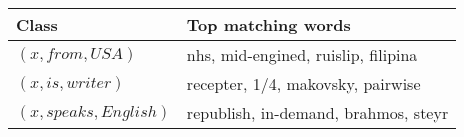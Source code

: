 \begin{tabular}{ l l }
    \toprule

    \multicolumn{1}{l}{\textbf{Class}} &
    \multicolumn{1}{l}{\textbf{Top matching words}} \\

    \midrule

    $(x, from, USA)$ & nhs, mid-engined, ruislip, filipina   \\
    $(x, is, writer)$                               & recepter, 1/4, makovsky, pairwise     \\
    $(x, speaks, English)$    & republish, in-demand, brahmos, steyr \\

    \bottomrule
\end{tabular}
